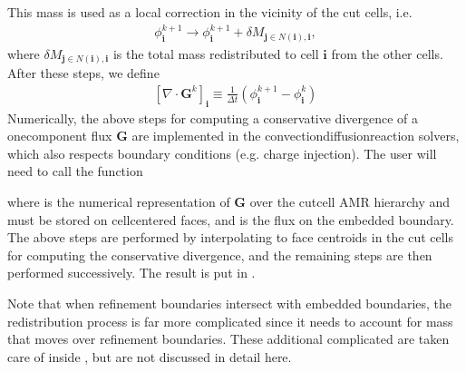 \documentclass[letterpaper,10pt,english]{sphinxmanual}
\begin{document}
\sphinxAtStartPar
This mass is used as a local correction in the vicinity of the cut cells, i.e.
\begin{equation*}
\begin{split}\phi_{\mathbf{i}}^{k+1} \rightarrow \phi_{\mathbf{i}}^{k+1} + \delta M_{\mathbf{j}\in N(\mathbf{i}), \mathbf{i}},\end{split}
\end{equation*}
\sphinxAtStartPar
where \(\delta M_{\mathbf{j}\in N(\mathbf{i}), \mathbf{i}}\) is the total mass redistributed to cell \(\mathbf{i}\) from the other cells.
After these steps, we define
\begin{equation*}
\begin{split}\left[\nabla\cdot\mathbf{G}^k\right]_{\mathbf{i}} \equiv \frac{1}{\Delta t}\left(\phi_{\mathbf{i}}^{k+1} - \phi_{\mathbf{i}}^k\right)\end{split}
\end{equation*}
\sphinxAtStartPar
Numerically, the above steps for computing a conservative divergence of a one\sphinxhyphen{}component flux \(\mathbf{G}\) are implemented in the convection\sphinxhyphen{}diffusion\sphinxhyphen{}reaction solvers, which also respects boundary conditions (e.g. charge injection).
The user will need to call the function

\begin{sphinxVerbatim}[commandchars=\\\{\},formatcom=\scriptsize]
        
\end{sphinxVerbatim}

\sphinxAtStartPar
where  is the numerical representation of \(\mathbf{G}\) over the cut\sphinxhyphen{}cell AMR hierarchy and must be stored on cell\sphinxhyphen{}centered faces, and  is the flux on the embedded boundary.
The above steps are performed by interpolating  to face centroids in the cut cells for computing the conservative divergence, and the remaining steps are then performed successively.
The result is put in .

\sphinxAtStartPar
Note that when refinement boundaries intersect with embedded boundaries, the redistribution process is far more complicated since it needs to account for mass that moves over refinement boundaries.
These additional complicated are taken care of inside , but are not discussed in detail here.
\end{document}
